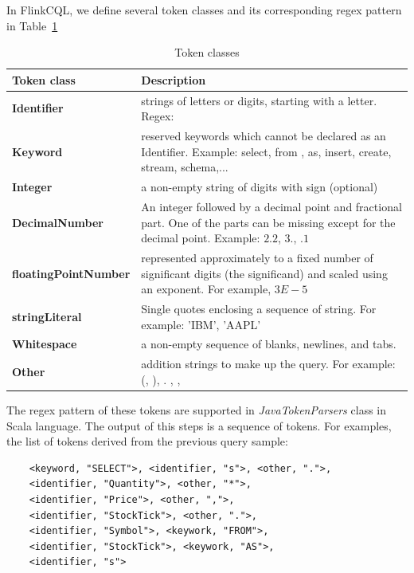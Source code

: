 In FlinkCQL, we define several token classes and its corresponding regex pattern in Table~\ref{table:TokenClass}


\begin{table}[h]
\caption{Token classes}
\centering
\label{table:TokenClass}
\setlength\extrarowheight{5pt}
\begin{tabular}{||>{\centering\bfseries}m{2in}   |>{\centering\arraybackslash}m{3in}||}
\hline
\textbf{Token class} & \textbf{Description} \\ \hline\hline
                 Identifier  & strings of letters or digits, starting with a letter. Regex: 
                                \\ \hline
                   Keyword	  & reserved keywords which cannot be declared as an Identifier. Example: select, from , as, insert, create, stream, schema,... \\ \hline
                   Integer		& a non-empty string of digits with sign (optional) \\ \hline %
				   DecimalNumber		&  An integer followed by a decimal point and fractional part. One of the parts can be missing except for the decimal point. Example: $2.2$, $3.$, $.1$   \\ \hline %
					floatingPointNumber	& represented approximately to a fixed number of significant digits (the significand) and scaled using an exponent. For example, $3E-5$			               \\ \hline		%
					stringLiteral		& Single quotes enclosing a sequence of string. For example: 'IBM', 'AAPL'			 \\ \hline
					Whitespace		& a non-empty sequence of blanks, newlines, and tabs.	 		                      \\ \hline								
					Other	& addition strings to make up the query. For example: (, ), . , {, }		                     \\ \hline							           							           							           							           
\end{tabular}
\end{table}

The regex pattern of these tokens are supported in \textit{JavaTokenParsers} class in Scala language. The output of this steps is a sequence of tokens. For examples, the list of tokens derived from the previous query sample:
\begin{lstlisting}
	<keyword, "SELECT">, <identifier, "s">, <other, ".">,
	<identifier, "Quantity">, <other, "*">, 
	<identifier, "Price">, <other, ",">, 
	<identifier, "StockTick">, <other, ".">,
	<identifier, "Symbol">, <keywork, "FROM">,
	<identifier, "StockTick">, <keywork, "AS">, 
	<identifier, "s">   
\end{lstlisting}

